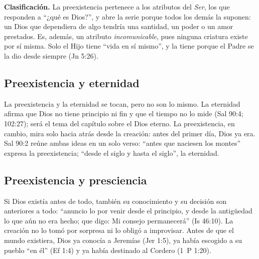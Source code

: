 
\textbf{Clasificación.} La preexistencia pertenece a los atributos del \emph{Ser}, los que responden a ``¿qué es Dios?'', y abre la serie porque todos los demás la suponen: un Dios que dependiera de algo tendría una santidad, un poder o un amor prestados. Es, además, un atributo \emph{incomunicable}, pues ninguna criatura existe por sí misma. Solo el Hijo tiene ``vida en sí mismo'', y la tiene porque el Padre se la dio desde siempre (Jn 5:26).

\subsection{Preexistencia y eternidad}
La preexistencia y la eternidad se tocan, pero no son lo mismo. La eternidad afirma que Dios no tiene principio ni fin y que el tiempo no lo mide (Sal 90:4; 102:27); será el tema del capítulo sobre el Dios eterno. La preexistencia, en cambio, mira solo hacia atrás desde la creación: antes del primer día, Dios ya era. Sal 90:2 reúne ambas ideas en un solo verso: ``antes que naciesen los montes'' expresa la preexistencia; ``desde el siglo y hasta el siglo'', la eternidad.

\subsection{Preexistencia y presciencia}
Si Dios existía antes de todo, también su conocimiento y su decisión son anteriores a todo: ``anuncio lo por venir desde el principio, y desde la antigüedad lo que aún no era hecho; que digo: Mi consejo permanecerá'' (Is 46:10). La creación no lo tomó por sorpresa ni lo obligó a improvisar. Antes de que el mundo existiera, Dios ya conocía a Jeremías (Jer 1:5), ya había escogido a su pueblo ``en él'' (Ef 1:4) y ya había destinado al Cordero (1~P 1:20).

